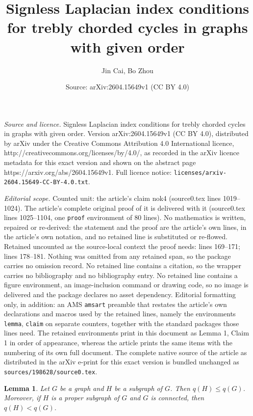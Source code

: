 \documentclass[10pt,a4paper]{amsart}
\title{Signless Laplacian index conditions for trebly chorded cycles in graphs with given order}
\author{Jin Cai, Bo Zhou}
\date{Source: arXiv:2604.15649v1 (CC BY 4.0)}
\newtheorem{lemma}{Lemma}
\begin{document}
\maketitle

\noindent\emph{Source and licence.} Signless Laplacian index conditions for trebly chorded cycles in graphs with given order. Version arXiv:2604.15649v1 (CC BY 4.0), distributed by arXiv under the Creative Commons Attribution 4.0 International licence, http://creativecommons.org/licenses/by/4.0/, as recorded in the arXiv licence metadata for this exact version and shown on the abstract page https://arxiv.org/abs/2604.15649v1. Full licence notice: \texttt{licenses/arxiv-2604.15649-CC-BY-4.0.txt}.\par\smallskip

\noindent\textit{Editorial scope.} Counted unit: the article's claim nok4 (source0.tex lines 1019--1024). The article's complete original proof of it is delivered with it (source0.tex lines 1025--1104, one \texttt{proof} environment of 80 lines). No mathematics is written, repaired or re-derived: the statement and the proof are the article's own lines, in the article's own notation, and no retained line is substituted or re-flowed.  Retained uncounted as the source-local context the proof needs: lines 169--171; lines 178--181.  Nothing was omitted from any retained span, so the package carries no omission record.  No retained line contains a citation, so the wrapper carries no bibliography and no bibliography entry.  No retained line contains a figure environment, an image-inclusion command or drawing code, so no image is delivered and the package declares no asset dependency.  Editorial formatting only, in addition: an AMS \texttt{amsart} preamble that restates the article's own declarations and macros used by the retained lines, namely the environments \texttt{lemma}, \texttt{claim} on separate counters, together with the standard packages those lines need.  The retained environments print in this document as Lemma 1, Claim 1 in order of appearance, whereas the article prints the same items with the numbering of its own full document.  The complete native source of the article as distributed in the arXiv e-print for this exact version is bundled unchanged as \texttt{sources/198628/source0.tex}.
\begin{lemma}\label{addedges}
Let $G$ be a graph and $H$ be a subgraph of $G$. Then $q(H)\le q(G)$. Moreover, if $H$ is a proper subgraph of $G$ and $G$ is connected,  then $q(H)<q(G)$.
\end{lemma}
\end{document}
